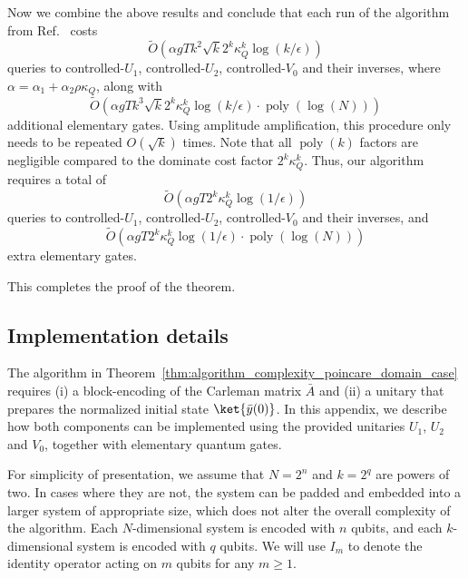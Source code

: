 \documentclass[superscriptaddress,onecolumn,nofootinbib,longbibliography,a4paper,accepted=2026-09-29]{quantumarticle}
\theoremstyle{plain}
\theoremstyle{definition}
\numberwithin{thm}{section}
\numberwithin{assumption}{section}
\numberwithin{lemma}{section}
\numberwithin{prop}{section}
\numberwithin{cor}{section}
\numberwithin{definition}{section}
\numberwithin{rmk}{section}
\numberwithin{equation}{section}
\newcommand{\lrb}[1]{\left ( #1 \right )}
\newcommand{\mypoly}[1]{\operatorname{poly} \lrb{#1}}
\newcommand{\mylog}[1]{\operatorname{log} \lrb{#1}}
\newcommand{\myO}[1]{O\lrb{#1}}
\newcommand{\mytO}[1]{\tilde{O}\lrb{#1}}
\begin{document}
Now we combine the above results and conclude that each run of the algorithm from Ref.~\cite{jennings2023cost} costs $$\mytO{\alpha g T k^2\sqrt{k} 2^k \kappa_Q^k \mylog{k/\epsilon}}
$$ 
queries to 
controlled-$U_1$,
controlled-$U_2$,
controlled-$V_0$ and their inverses,
where $\alpha=\alpha_1+{\alpha_2\rho \kappa_Q}$, 
along with
$$\mytO{\alpha g T k^3 \sqrt{k} 2^k \kappa_Q^k \mylog{k/\epsilon} \cdot \mypoly{\mylog{N}}}$$ 
additional elementary gates. Using amplitude amplification,  this procedure only needs to be repeated $\myO{\sqrt{k}}$ times. Note that all $\mypoly{k}$ factors are negligible compared to the dominate cost factor $2^k \kappa_Q^k$. Thus, our algorithm requires a total of
$$\mytO{\alpha g T  2^k \kappa_Q^k\mylog{1/\epsilon}}$$
queries to 
controlled-$U_1$,
controlled-$U_2$, 
controlled-$V_0$ and their inverses,
and
$$\mytO{\alpha g T 2^k \kappa_Q^k \mylog{1/\epsilon} \cdot \mypoly{\mylog{N}}}$$
extra elementary gates. 

This completes the proof of the theorem.

\subsection{Implementation details}
\label{app:implemenation_algorithm_poincare_domain_case}

The algorithm in Theorem~\ref{thm:algorithm_complexity_poincare_domain_case} requires (i) a block-encoding of the Carleman matrix $\bar{A}$ and (ii) a unitary that prepares the normalized initial state $\ket{\bar{y}(0)}$. In this appendix, we describe  how both components can be implemented using the provided unitaries $U_1$, $U_2$ and $V_0$, together with elementary quantum gates.

For simplicity of presentation, we assume that $N=2^n$ and $k=2^q$ are powers of two. In cases where they are not, the system can be padded and embedded into a larger system of appropriate size, which does not alter the overall complexity of the algorithm. Each $N$-dimensional system is encoded with $n$ qubits, and each $k$-dimensional system is encoded with $q$ qubits. We will use $I_m$ to denote the identity operator acting on $m$ qubits for any $m \ge 1$.
\end{document}
